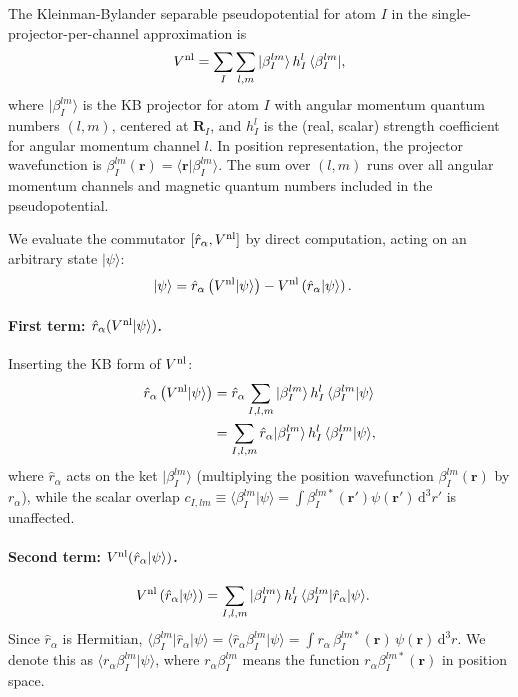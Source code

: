 The Kleinman-Bylander separable pseudopotential for atom $I$ in the
single-projector-per-channel approximation
is\cite{kleinman-bylander-1982}
\begin{equation}
  V^{\mathrm{nl}} = \sum_I\sum_{l,m}
  |\beta^{lm}_I\rangle\, h^l_I\,
  \langle\beta^{lm}_I|,
  \label{eq:KB-def}
\end{equation}
where $|\beta^{lm}_I\rangle$ is the KB projector for atom $I$
with angular momentum quantum numbers $(l,m)$, centered at
$\mathbf{R}_I$, and $h^l_I$ is the (real, scalar) strength
coefficient for angular momentum channel $l$.
In position representation, the projector wavefunction is
$\beta^{lm}_I(\mathbf{r}) = \langle\mathbf{r}|\beta^{lm}_I\rangle$.
The sum over $(l,m)$ runs over all angular momentum channels and
magnetic quantum numbers included in the pseudopotential.

We evaluate the commutator $[\hat{r}_\alpha, V^{\mathrm{nl}}]$ by direct
computation, acting on an arbitrary state $|\psi\rangle$:
\begin{align}
  [\hat{r}_\alpha, \Vnl]|\psi\rangle
  &= \hat{r}_\alpha\left(\Vnl|\psi\rangle\right)
   - \Vnl\left(\hat{r}_\alpha|\psi\rangle\right).
  \label{eq:comm-expand}
\end{align}

\paragraph{First term: $\hat{r}_\alpha(V^{\mathrm{nl}}|\psi\rangle)$.}
Inserting the KB form of $V^{\mathrm{nl}}$:
\begin{align}
  \hat{r}_\alpha\left(V^{\mathrm{nl}}|\psi\rangle\right)
  &= \hat{r}_\alpha\sum_{I,l,m}
     |\beta^{lm}_I\rangle\, h^l_I\,
     \langle\beta^{lm}_I|\psi\rangle
  \nonumber \\
  &= \sum_{I,l,m}
     \hat{r}_\alpha|\beta^{lm}_I\rangle\, h^l_I\,
     \langle\beta^{lm}_I|\psi\rangle,
  \label{eq:term1}
\end{align}
where $\hat{r}_\alpha$ acts on the ket $|\beta^{lm}_I\rangle$
(multiplying the position wavefunction $\beta^{lm}_I(\mathbf{r})$
by $r_\alpha$), while the scalar overlap
$c_{I,lm} \equiv \langle\beta^{lm}_I|\psi\rangle
= \int\beta^{lm*}_I(\mathbf{r}')\psi(\mathbf{r}')\,\mathrm{d}^3r'$
is unaffected.

\paragraph{Second term: $V^{\mathrm{nl}}(\hat{r}_\alpha|\psi\rangle)$.}
\begin{align}
  V^{\mathrm{nl}}\left(\hat{r}_\alpha|\psi\rangle\right)
  &= \sum_{I,l,m}
     |\beta^{lm}_I\rangle\, h^l_I\,
     \langle\beta^{lm}_I|\hat{r}_\alpha|\psi\rangle.
  \label{eq:term2}
\end{align}
Since $\hat{r}_\alpha$ is Hermitian,
$\langle\beta^{lm}_I|\hat{r}_\alpha|\psi\rangle
= \langle\hat{r}_\alpha\beta^{lm}_I|\psi\rangle
= \int r_\alpha\,\beta^{lm*}_I(\mathbf{r})\,\psi(\mathbf{r})\,
\mathrm{d}^3r$.
We denote this as $\langle r_\alpha\beta^{lm}_I|\psi\rangle$,
where $r_\alpha\beta^{lm}_I$ means the function
$r_\alpha\beta^{lm*}_I(\mathbf{r})$ in position space.

